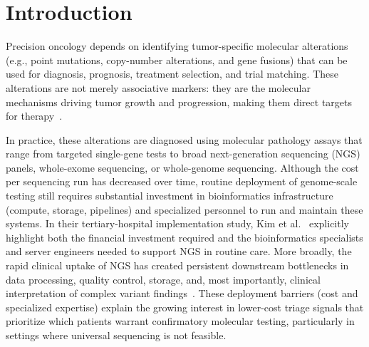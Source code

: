 \section{Introduction}\label{sec:intro}

Precision oncology depends on identifying tumor-specific molecular alterations (e.g., point mutations, copy-number alterations, and gene fusions) that can be used for diagnosis, prognosis, treatment selection, and trial matching. 
These alterations are not merely associative markers: they are the molecular mechanisms driving tumor growth and progression, making them direct targets for therapy~\cite{sanchez-vegaOncogenicSignalingPathways2018, drilonEfficacyLarotrectinibTRK2018, mateoDeliveringPrecisionOncology2022}.

In practice, these alterations are diagnosed using molecular pathology assays that range from targeted single-gene tests to broad next-generation sequencing (NGS) panels, whole-exome sequencing, or whole-genome sequencing. 
Although the cost per sequencing run has decreased over time, routine deployment of genome-scale testing still requires substantial investment in bioinformatics infrastructure (compute, storage, pipelines) and specialized personnel to run and maintain these systems.
In their tertiary-hospital implementation study, Kim et al.~\cite{kimClinicalImplementationNextgeneration2025} explicitly highlight both the financial investment required and the bioinformatics specialists and server engineers needed to support NGS in routine care. 
More broadly, the rapid clinical uptake of NGS has created persistent downstream bottlenecks in data processing, quality control, storage, and, most importantly, clinical interpretation of complex variant findings~\cite{karakoyunChallengesClinicalInterpretation2023}. 
These deployment barriers (cost and specialized expertise) explain the growing interest in lower-cost triage signals that prioritize which patients warrant confirmatory molecular testing, particularly in settings where universal sequencing is not feasible.

